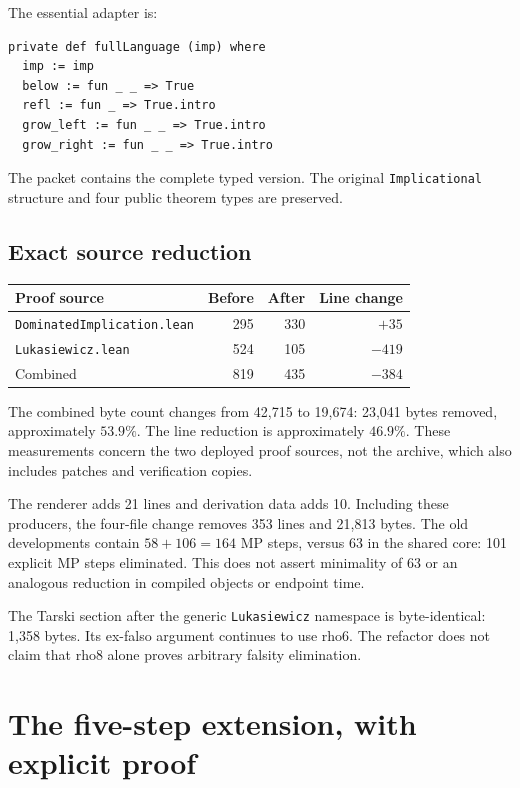 \documentclass[11pt,letterpaper]{article}
\newcommand{\code}[1]{\texttt{#1}}
\begin{document}
The essential adapter is:
\begin{lstlisting}
private def fullLanguage (imp) where
  imp := imp
  below := fun _ _ => True
  refl := fun _ => True.intro
  grow_left := fun _ _ => True.intro
  grow_right := fun _ _ => True.intro
\end{lstlisting}
The packet contains the complete typed version. The original
\code{Implicational} structure and four public theorem types are preserved.

\subsection{Exact source reduction}

\begin{center}
\begin{tabular}{lrrr}
\toprule
Proof source & Before & After & Line change\\
\midrule
\code{DominatedImplication.lean} & 295 & 330 & \(+35\)\\
\code{Lukasiewicz.lean} & 524 & 105 & \(-419\)\\
\midrule
Combined & 819 & 435 & \(-384\)\\
\bottomrule
\end{tabular}
\end{center}
The combined byte count changes from 42,715 to 19,674: 23,041 bytes removed,
approximately \(53.9\%\). The line reduction is approximately \(46.9\%\).
These measurements concern the two deployed proof sources, not the archive,
which also includes patches and verification copies.

The renderer adds 21 lines and derivation data adds 10. Including these producers,
the four-file change removes 353 lines and 21,813 bytes. The old developments
contain \(58+106=164\) MP steps, versus 63 in the shared core: 101 explicit
MP steps eliminated. This does not assert minimality of 63 or an analogous
reduction in compiled objects or endpoint time.

The Tarski section after the generic \code{Lukasiewicz} namespace is byte-identical:
1,358 bytes. Its ex-falso argument continues to use rho6. The refactor does not
claim that rho8 alone proves arbitrary falsity elimination.

\section{The five-step extension, with explicit proof}
\label{sec:five}
\end{document}
